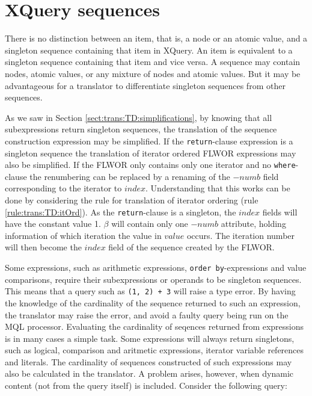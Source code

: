 \section{XQuery sequences}
\label{sect:disc:singelton}

There is no distinction between an item, that is, a node or an atomic value, and a singleton sequence containing
that item in XQuery. An item is equivalent to a singleton sequence containing that item and vice versa. A sequence
may contain nodes, atomic values, or any mixture of nodes and atomic values. But it may be advantageous for a
translator to differentiate singleton sequences from other sequences. 

As we saw in Section \ref{sect:trans:TD:simplifications}, by knowing that all subexpressions return singleton
sequences, the translation of the sequence construction expression may be simplified. If the
\texttt{return}-clause expression is a singleton sequence the translation of iterator ordered FLWOR expressions
may also be simplified. If the FLWOR only contains only one iterator and no \texttt{where}-clause the renumbering
can be replaced by a renaming of the $-numb$ field corresponding to the iterator to $index$. Understanding that
this works can be done by considering the rule for translation of iterator ordering (rule
\ref{rule:trans:TD:itOrd}). As the \texttt{return}-clause is a singleton, the $index$ fields will have the
constant value 1. $\beta$ will contain only one $-numb$ attribute, holding information of which iteration the
value in $value$ occurs. The iteration number will then become the $index$ field of the sequence created by the FLWOR.

Some expressions, such as arithmetic expressions, \texttt{order by}-expressions and value comparisons, require
their subexpressions or operands to be singleton sequences. This means that a query such as \texttt{(1, 2) + 3}
will raise a type error. By having the knowledge of the cardinality of the sequence returned to such an
expression, the translator may raise the error, and avoid a faulty query being run on the MQL processor.
Evaluating the cardinality of seqences returned from expressions is in many cases a simple task. Some expressions
will always return singletons, such as logical, comparison and aritmetic expressions, iterator variable references
and literals. The cardinality of sequences constructed of such expressions may also be calculated in the
translator. A problem arises, however, when dynamic content (not from the query
itself) is included. Consider the following query:

